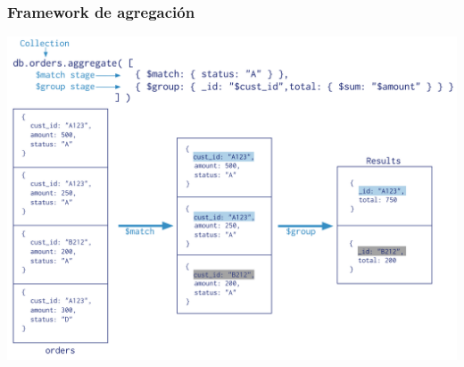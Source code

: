 \documentclass[14pt]{beamer}
\begin{document}
\begin{frame}
  \frametitle{Framework de agregación}
  \centering\includegraphics[height=.85\textheight]{img/mongo-aggregation}
\end{frame}



\end{document}
